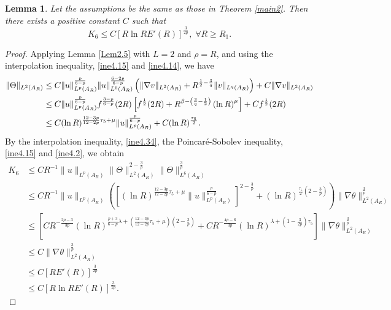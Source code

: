 \documentclass[11pt,reqno]{amsart}
\newtheorem{Lem}{Lemma}[section]
\numberwithin{Thm}{section}
\begin{document}
\begin{Lem}\label{Lem4.8}
	Let the assumptions be the same as those in  {\rm Theorem \ref{main2}}. Then there exists a positive constant $C$ such that
	\begin{equation}\label{ine4.33}
		K_6 \leq C \left[ R \ln R E'(R) \right]^{\frac{3}{2p}},\;\forall R\geq R_1.
	\end{equation}
\end{Lem}
\begin{proof}
Applying Lemma \ref{Lem2.5} with $L=2$ and $\rho=R$, and using the interpolation inequality, \eqref{ine4.15} and \eqref{ine4.14}, we have
	\begin{align}\label{ine4.34}
	\|\Theta\|_{L^2(A_R)} &\leq C\|u\|_{L^p(A_R)}^{\frac{p}{6-p}} \|u\|_{L^6(A_R)}^{\frac{6-2p}{6-p}} \left( \|\nabla v\|_{L^2(A_R)} + R^{\frac{1}{2}-\frac{3}{q}}\|v\|_{L^q(A_R)} \right) + C\|\nabla v\|_{L^2(A_R)} \notag\\
	&\leq C\|u\|_{L^p(A_R)}^{\frac{p}{6-p}} f^{\frac{3-p}{6-p}}(2R) \left[ f^{\frac{1}{2}} (2R)+ R^{\beta-\left(\frac{3}{q}-\frac{1}{2}\right)}\left(\ln R\right)^\mu\right] + C f^{\frac{1}{2}}(2R) \\
	&\leq C (\ln R)^{\frac{12-3p}{12-2p}\tau_{5}+\mu} \|u\|_{L^p(A_R)}^{\frac{p}{6-p}} + C (\ln R)^{\frac{\tau_{5}}{2}}.\notag
\end{align}
By the interpolation inequality, \eqref{ine4.34}, the Poincar\'{e}-Sobolev inequality, \eqref{ine4.15} and \eqref{ine4.2},  we obtain
\begin{align*}
	K_6 &\leq C R^{-1} \|u\|_{L^p(A_R)} \|\Theta\|_{L^2(A_R)}^{2-\frac{3}{p}} \|\Theta\|_{L^6(A_R)}^{\frac{3}{p}} \\
	&\leq C R^{-1} \|u\|_{L^p(A_R)} \left(\left[ (\ln R)^{\frac{12-3p}{12-2p}\tau_{5}+\mu} \|u\|_{L^p(A_R)}^{\frac{p}{6-p}} \right]^{2-\frac{3}{p}}
	+ (\ln R)^{\frac{\tau_{5}}{2}\left(2-\frac{3}{p}\right)}\right) \|\nabla \theta\|_{L^2(A_R)}
^{\frac{3}{p}} \\
	&\leq \left[ C R^{-\frac{2p-3}{3p}} (\ln R)^{\frac{p+3}{6-p}\lambda+\left(\frac{12-3p}{12-2p}\tau_{5}+\mu\right)\left(2-\frac{3}{p}\right)}
	+ C R^{-\frac{4p-6}{3p}} (\ln R)^{\lambda+\left(1-\frac{3}{2p}\right)\tau_{5}} \right] \|\nabla \theta\|_{L^2(A_R)}^{\frac{3}{p}}\\
&\leq C \|\nabla \theta\|_{L^2(A_R)}^{\frac{3}{p}} \\
	&\leq C \left[ R E'(R) \right]^{\frac{3}{2p}} \\
	&\leq C \left[ R \ln R E'(R) \right]^{\frac{3}{2p}}.
\end{align*}

\end{proof}
\end{document}
